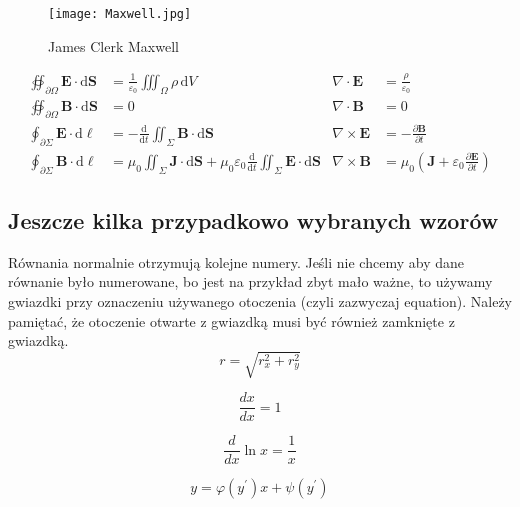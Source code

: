 \begin{figure}[!t]
	\centering \texttt{[image: Maxwell.jpg]}
	\caption{James Clerk Maxwell}
	\label{rys:maxwell}
\end{figure}

\begin{align}
\oiint\nolimits_{\partial \Omega} \pmb{E} \cdot \mathrm{d}\pmb{S} &= \frac{1}{\varepsilon_0} \iiint\nolimits_\Omega \rho \, \mathrm{d}V &  \nabla \cdot \pmb{E} &= \frac {\rho} {\varepsilon_0} \label{eq:maxwell1} \\
\oiint\nolimits_{\partial \Omega} \pmb{B} \cdot \mathrm{d}\pmb{S} &= 0 & \nabla \cdot \pmb{B} &= 0 \label{eq:maxwell2} \\
\oint\nolimits_{\partial \Sigma} \pmb{E} \cdot \mathrm{d}\boldsymbol{\ell} &= -\frac{\mathrm{d}}{\mathrm{d}t}\iint\nolimits_{\Sigma}\pmb{B}\cdot\mathrm{d}\pmb{S} & \nabla \times \pmb{E} &= -\frac{\partial \pmb{B}}{\partial t} \label{eq:maxwell3} \\
\oint\nolimits_{\partial \Sigma} \pmb{B} \cdot \mathrm{d}\boldsymbol{\ell} &= \mu_0 \iint\nolimits_{\Sigma} \pmb{J} \cdot \mathrm{d}\pmb{S} + \mu_0 \varepsilon_0 \frac{\mathrm{d}}{\mathrm{d}t} \iint\nolimits_{\Sigma} \pmb{E} \cdot \mathrm{d}\pmb{S} & \nabla \times \pmb{B} &= \mu_0\left(\pmb{J} + \varepsilon_0 \frac{\partial \pmb{E}} {\partial t} \right) \label{eq:maxwell4}
\end{align}


\subsection{Jeszcze kilka przypadkowo wybranych wzorów}
Równania normalnie otrzymują kolejne numery. Jeśli nie chcemy aby dane równanie było numerowane, bo jest na przykład zbyt mało ważne, to używamy gwiazdki przy oznaczeniu używanego otoczenia (czyli zazwyczaj equation). Należy pamiętać, że otoczenie otwarte z gwiazdką musi być również zamknięte z gwiazdką.
\begin{equation*}
    r = \sqrt{r_x^2 + r_y^2}
\end{equation*}

\begin{equation}
    \frac{dx}{dx} = 1
\end{equation}

\begin{equation}
    \frac{d}{dx} \ln x = \frac{1}{x}
\end{equation}

\begin{equation}
    y = \varphi  (y^\prime)x + \psi(y^\prime)
\end{equation}

